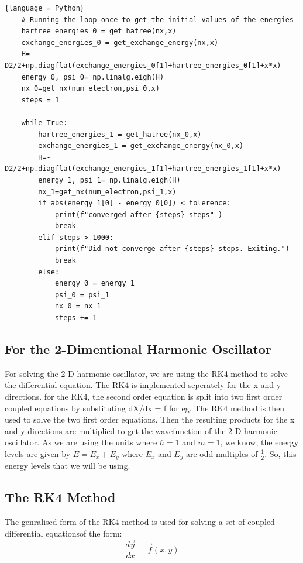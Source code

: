 \documentclass{article}
\begin{document}
\begin{multicols}{2}
\begin{lstlisting}{language = Python}
    # Running the loop once to get the initial values of the energies
    hartree_energies_0 = get_hatree(nx,x)
    exchange_energies_0 = get_exchange_energy(nx,x)
    H=-D2/2+np.diagflat(exchange_energies_0[1]+hartree_energies_0[1]+x*x)
    energy_0, psi_0= np.linalg.eigh(H)
    nx_0=get_nx(num_electron,psi_0,x)
    steps = 1
    
    while True:
        hartree_energies_1 = get_hatree(nx_0,x)
        exchange_energies_1 = get_exchange_energy(nx_0,x)
        H=-D2/2+np.diagflat(exchange_energies_1[1]+hartree_energies_1[1]+x*x)
        energy_1, psi_1= np.linalg.eigh(H)
        nx_1=get_nx(num_electron,psi_1,x)
        if abs(energy_1[0] - energy_0[0]) < tolerence:
            print(f"converged after {steps} steps" )
            break
        elif steps > 1000:
            print(f"Did not converge after {steps} steps. Exiting.")
            break
        else:
            energy_0 = energy_1
            psi_0 = psi_1
            nx_0 = nx_1
            steps += 1

\end{lstlisting}    
    


\subsection{For the 2-Dimentional Harmonic Oscillator}

For solving the 2-D harmonic oscillator, we are using the RK4 method to solve the differential equation. The RK4 is implemented seperately for the x and y directions. for the RK4, the second order equation is split into two first order coupled equations by substituting dX/dx = f for eg. The RK4 method is then used to solve the two first order equations. Then the resulting products for the x and y directions are multiplied to get the wavefunction of the 2-D harmonic oscillator. As we are using the units where $\hbar = 1$ and $m = 1$, we know, the energy levels are given by $E = E_x + E_y$ where $E_x$ and $E_y$  are odd multiples of $\frac{1}{2}$. So, this energy levels that we will be using.


\subsection{The RK4 Method}

The genralised form of the RK4 method is used for solving a set of coupled differential equationsof the form:
\begin{equation}
    \frac{d\vec{y}}{dx} = \vec{f}(x,y)
\end{equation}
 

\end{multicols}
\end{document}
